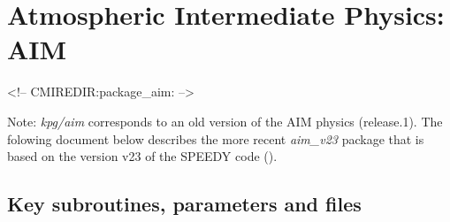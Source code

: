 \section{Atmospheric Intermediate Physics: AIM}
\label{sec:aim}
\label{sec:pkg:aim}
\begin{rawhtml}
<!-- CMIREDIR:package_aim: -->
\end{rawhtml}

Note:
 {\it kpg/aim} corresponds to an old version of the AIM physics (release.1).
 The folowing document below describes the more recent {\it aim\_v23} package
 that is based on the version v23 of the SPEEDY code (\cite{molteni:03}).

\subsection{Key subroutines, parameters and files}
\label{sec:pkg:aim:implementation}
